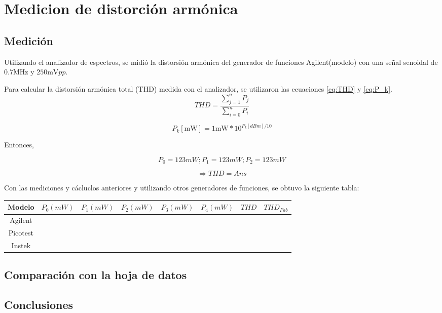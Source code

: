 \chapter{Medicion de distorción armónica}
\section{Medición}
Utilizando el analizador de espectros, se midió la distorsión armónica del generador de funciones Agilent(modelo)
con una señal senoidal de $0.7\si{\mega\hertz}$ y $250\si{\milli\volt} pp$.

Para calcular la distorsión armónica total (THD) medida con el analizador, se utilizaron las ecuaciones \ref{eq:THD}
y \ref{eq:P_k}.
\begin{equation}
    THD=\frac{\sum_{j=1}^{n} P_j}{\sum_{i=0}^{n} P_i}
    \label{eq:THD}
\end{equation}

\begin{equation}
    P_k[\si{\milli\watt}]= 1\si{\milli\watt} * 10^{P_k[dBm]/10}
    \label{eq:P_k}
\end{equation}

Entonces,

\begin{equation*}
    P_0 = 123 mW;P_1 = 123 mW;P_2 = 123 mW
\end{equation*}

\begin{equation}
    \Rightarrow THD = Ans
\end{equation}

Con las mediciones y cácluclos anteriores y utilizando otros generadores de funciones, se obtuvo la siguiente tabla:

\begin{table}[h]
    \begin{center}
        \begin{tabular}{|c|c|c|c|c|c|c|c|}
            \hline
            Modelo & $P_0 (mW)$ & $P_1 (mW)$ & $P_2(mW)$ & $P_3(mW)$ & $P_4(mW)$ & $THD$ & $THD_{Fab}$ \\
            \hline
            Agilent  & & & & & & & \\
            Picotest & & & & & & & \\
            Instek   & & & & & & & \\
            \hline
        \end{tabular}
    \end{center}
\end{table}

\section{Comparación con la hoja de datos}

\section{Conclusiones}